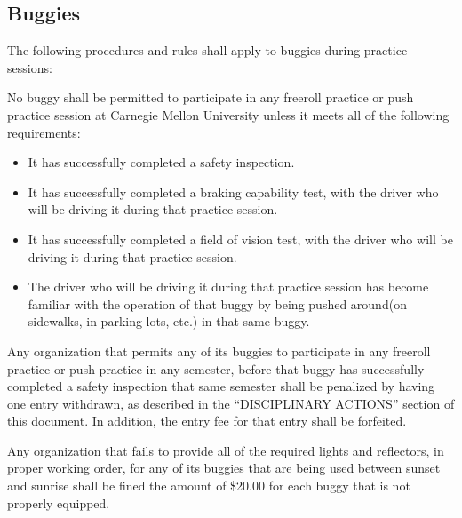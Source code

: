 \subsection{Buggies}

	The following procedures and rules shall apply to buggies during practice
	sessions:
	\newline

	\noindent No buggy shall be permitted to participate in any freeroll practice or push
	practice session at Carnegie Mellon University unless it meets all of the
	following requirements:

	\begin{itemize}

		\item It has successfully completed a safety inspection.

		\item It has successfully completed a braking capability test, with the
		driver who will be driving it during that practice session.

		\item It has successfully completed a field of vision test, with the driver
		who will be driving it during that practice session.

		\item The driver who will be driving it during that practice session has
		become familiar with the operation of that buggy by being pushed around(on
		sidewalks, in parking lots, etc.) in that same buggy.

	\end{itemize}

	Any organization that permits any of its buggies to participate in any freeroll
	practice or push practice in any semester, before that buggy has successfully
	completed a safety inspection that same semester shall be penalized by having
	one entry withdrawn, as described in the ``DISCIPLINARY ACTIONS'' section of
	this document. In addition, the entry fee for that entry shall be forfeited.

	Any organization that fails to provide all of the required lights and
	reflectors, in proper working order, for any of its buggies that are being used
	between sunset and sunrise shall be fined the amount of \$20.00 for each buggy
	that is not properly equipped.


